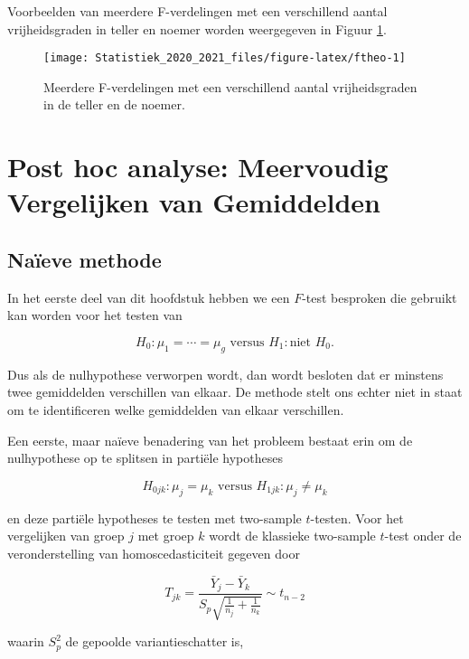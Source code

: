 \documentclass[
  12pt,dutch,coursenotes]{book}
\theoremstyle{definition}
\theoremstyle{definition}
\theoremstyle{definition}
\theoremstyle{remark}
\begin{document}
Voorbeelden van meerdere F-verdelingen met een verschillend aantal vrijheidsgraden in teller en noemer worden weergegeven in Figuur \ref{fig:ftheo}.

\begin{figure}

{\centering \texttt{[image: Statistiek\_2020\_2021\_files/figure-latex/ftheo-1]} 

}

\caption{Meerdere F-verdelingen met een verschillend aantal vrijheidsgraden in de teller en de noemer.}\label{fig:ftheo}
\end{figure}

\hypertarget{post-hoc-analyse-meervoudig-vergelijken-van-gemiddelden}{%
\section{Post hoc analyse: Meervoudig Vergelijken van Gemiddelden}\label{post-hoc-analyse-meervoudig-vergelijken-van-gemiddelden}}

\hypertarget{nauxefeve-methode}{%
\subsection{Naïeve methode}\label{nauxefeve-methode}}

In het eerste deel van dit hoofdstuk hebben we een \(F\)-test besproken die gebruikt kan worden voor het testen van

\[  H_0: \mu_1=\cdots = \mu_g \text{ versus } H_1: \text{niet } H_0.\]

Dus als de nulhypothese verworpen wordt, dan wordt besloten dat er minstens twee gemiddelden verschillen van elkaar. De methode stelt ons echter niet in staat om te identificeren welke gemiddelden van elkaar verschillen.

Een eerste, maar naïeve benadering van het probleem bestaat erin om de nulhypothese op te splitsen in partiële hypotheses

\[H_{0jk}: \mu_j=\mu_k \text{ versus } H_{1jk}: \mu_j \neq \mu_k\]

en deze partiële hypotheses te testen met two-sample \(t\)-testen. Voor het vergelijken van groep \(j\) met groep \(k\) wordt de klassieke two-sample \(t\)-test onder de veronderstelling van homoscedasticiteit gegeven door

\[T_{jk} = \frac{\bar{Y}_j-\bar{Y}_k}{S_p\sqrt{\frac{1}{n_j}+\frac{1}{n_k}}} \sim t_{n-2}\]

waarin \(S_p^2\) de gepoolde variantieschatter is,
\end{document}
